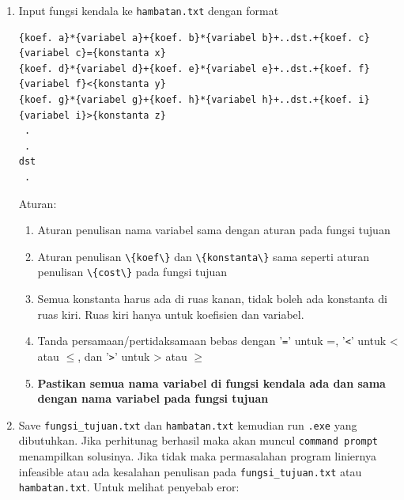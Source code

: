\documentclass[12pt]{article}
\newcommand{\inline}[1]{\lstinline[basicstyle=\footnotesize\color{black}\ttfamily]|#1|}
\begin{document}
\begin{enumerate}
{\begin{enumerate}
{\begin{align*}
\begin{matrix}
                    \end{matrix}
                \end{align*}
            }
        \end{enumerate}
        Contoh:
        \begin{align*}
            2,3\text{ variabel\_satu } -x_{11}\qquad   & \rightarrow\qquad  \begin{matrix*}[l]
                \text{\inline{2.3*variabel_satu}}\\
                \text{\inline{-1*x_11}}
            \end{matrix*}
        \end{align*}
    }\newpage
    \item {
        Input fungsi kendala ke \inline{hambatan.txt} dengan format
        \begin{lstlisting}
{koef. a}*{variabel a}+{koef. b}*{variabel b}+..dst.+{koef. c}{variabel c}={konstanta x}
{koef. d}*{variabel d}+{koef. e}*{variabel e}+..dst.+{koef. f}{variabel f}<{konstanta y}
{koef. g}*{variabel g}+{koef. h}*{variabel h}+..dst.+{koef. i}{variabel i}>{konstanta z}
 .
 .
dst
 .
        \end{lstlisting}
        Aturan:
        \begin{enumerate}
            \item {
                Aturan penulisan nama variabel sama dengan aturan pada fungsi tujuan
            }
            \item {
                Aturan penulisan \inline{\{koef\}} dan \inline{\{konstanta\}} sama seperti aturan penulisan \inline{\{cost\}} pada fungsi tujuan 
            }
            \item {
                Semua konstanta harus ada di ruas kanan, tidak boleh ada konstanta di ruas kiri. Ruas kiri hanya untuk koefisien dan variabel.
            }
            \item {
                Tanda persamaan/pertidaksamaan bebas dengan '\inline{=}' untuk =, '\inline{<}' untuk < atau $ \le $, dan '\inline{>}' untuk > atau $ \ge $
            }
            \item {
                \textbf{Pastikan semua nama variabel di fungsi kendala ada dan sama dengan nama variabel pada fungsi tujuan}
            }
        \end{enumerate}
    }
    \item {
        Save \inline{fungsi_tujuan.txt} dan \inline{hambatan.txt} kemudian run \inline{.exe} yang dibutuhkan. Jika perhitunag berhasil maka akan muncul \inline{command prompt} menampilkan solusinya. Jika tidak maka permasalahan program liniernya infeasible atau ada kesalahan penulisan pada \inline{fungsi_tujuan.txt} atau \inline{hambatan.txt}. Untuk melihat penyebab eror:
}
\end{enumerate}
\end{document}
